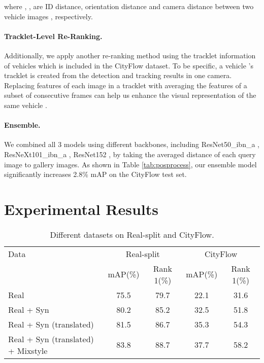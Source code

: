 \documentclass[10pt,twocolumn,letterpaper]{article}
\begin{document}
where , ,  are ID distance, orientation distance and camera distance between two vehicle images  , respectively.

\paragraph{Tracklet-Level Re-Ranking.} Additionally, we apply another re-ranking method using the tracklet information of vehicles which is included in the CityFlow dataset. To be specific, a vehicle 's tracklet is created from the detection and tracking results in one camera. Replacing features of each image in a tracklet with averaging the features of a subset of consecutive frames can help us enhance the visual representation of the same vehicle \cite{2nd}.

\paragraph{Ensemble.} We combined all 3 models using different backbones, including ResNet50\_ibn\_a \cite{ibn}, ResNeXt101\_ibn\_a \cite{ibn}, ResNet152 \cite{resnet}, by taking the averaged distance of each query image to gallery images. As shown in Table \ref{tab:posprocess}, our ensemble model significantly increases 2.8\% mAP on the CityFlow test set.
\section{Experimental Results}
\begin{table*}[h!]
	\centering
	\begin{tabular}{l|cc|cc}
		\hline
		Data & \multicolumn{2}{c}{Real-split} & \multicolumn{2}{c}{CityFlow}\\
		& mAP(\%)  & Rank 1(\%) & mAP(\%) & Rank 1(\%) \\
		\hline\hline
		Real & 75.5  & 79.7 & 22.1 & 31.6  \\
		\hline
		Real + Syn & 80.2  & 85.2 & 32.5 & 51.8  \\
		\hline
		Real + Syn (translated) & 81.5  & 86.7 & 35.3 & 54.3  \\
		\hline
		Real + Syn (translated) + Mixstyle & 83.8  & 88.7 & 37.7 & 58.2  \\
		\hline
	\end{tabular}
	\caption{Different datasets on Real-split and CityFlow.}
	\label{tab:dataset}
\end{table*}
\end{document}
